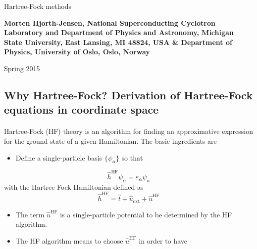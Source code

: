 \documentclass[%
twoside,                 %
final,                   %
10pt]{article}
\begin{document}




\thispagestyle{empty}

\begin{center}
{\LARGE\bf
\begin{spacing}{1.25}
Hartree-Fock methods
\end{spacing}
}
\end{center}


\begin{center}
{\bf Morten Hjorth-Jensen, National Superconducting Cyclotron Laboratory and Department of Physics and Astronomy, Michigan State University, East Lansing, MI 48824, USA {\&} Department of Physics, University of Oslo, Oslo, Norway${}^{}$} \\ [0mm]
\end{center}

    \begin{center}
\end{center}
    

\begin{center} %
Spring 2015
\end{center}

\vspace{1cm}


\subsection*{Why Hartree-Fock? Derivation of Hartree-Fock equations in coordinate space}

\paragraph{}
Hartree-Fock (HF) theory is an algorithm for finding an approximative expression for the ground state of a given Hamiltonian. The basic ingredients are
\begin{itemize}
  \item Define a single-particle basis $\{\psi_{\alpha}\}$ so that
\end{itemize}

\noindent
\[ 
\hat{h}^{\mathrm{HF}}\psi_{\alpha} = \varepsilon_{\alpha}\psi_{\alpha}
\]
with the Hartree-Fock Hamiltonian defined as
\[
\hat{h}^{\mathrm{HF}}=\hat{t}+\hat{u}_{\mathrm{ext}}+\hat{u}^{\mathrm{HF}}
\]
\begin{itemize}
  \item The term  $\hat{u}^{\mathrm{HF}}$ is a single-particle potential to be determined by the HF algorithm.

  \item The HF algorithm means to choose $\hat{u}^{\mathrm{HF}}$ in order to have 
\end{itemize}
\end{document}
